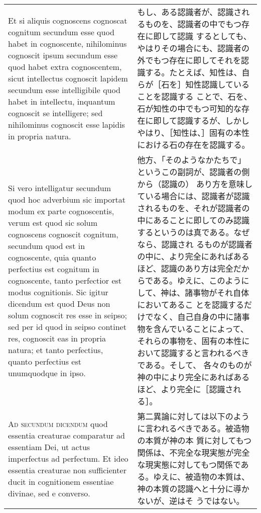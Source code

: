 \documentclass[10pt]{jsarticle} %
\begin{document}
\begin{longtable}{p{21em}p{21em}}
Et si aliquis cognoscens cognoscat cognitum secundum esse quod habet
in cognoscente, nihilominus cognoscit ipsum secundum esse quod habet
extra cognoscentem, sicut intellectus cognoscit lapidem secundum esse
intelligibile quod habet in intellectu, inquantum cognoscit se
intelligere; sed nihilominus cognoscit esse lapidis in propria natura.


&

もし、ある認識者が、認識されるものを、認識者の中でもつ存在に即して認識
するとしても、やはりその場合にも、認識者の外でもつ存在に即してそれを認
識する。たとえば、知性は、自らが［石を］知性認識していることを認識する
ことで、石を、石が知性の中でもつ可知的な存在に即して認識するが、しかし
やはり、［知性は、］固有の本性における石の存在を認識する。

\\



Si vero intelligatur secundum quod hoc adverbium sic importat modum ex
parte cognoscentis, verum est quod sic solum cognoscens cognoscit
cognitum, secundum quod est in cognoscente, quia quanto perfectius est
cognitum in cognoscente, tanto perfectior est modus cognitionis. Sic
igitur dicendum est quod Deus non solum cognoscit res esse in seipso;
sed per id quod in seipso continet res, cognoscit eas in propria
natura; et tanto perfectius, quanto perfectius est unumquodque in
ipso.

&

他方、「そのようなかたちで」というこの副詞が、認識者の側から（認識の）
あり方を意味している場合には、認識者が認識されるものを、それが認識者の
中にあることに即してのみ認識するというのは真である。なぜなら、認識され
るものが認識者の中に、より完全にあればあるほど、認識のあり方は完全だか
らである。ゆえに、このようにして、神は、諸事物がそれ自体においてあるこ
とを認識するだけでなく、自己自身の中に諸事物を含んでいることによって、
それらの事物を、固有の本性において認識すると言われるべきである。そして、
各々のものが神の中により完全にあればあるほど、より完全に［認識される］。

\\


{\scshape Ad secundum dicendum} quod essentia creaturae comparatur ad
essentiam Dei, ut actus imperfectus ad perfectum. Et ideo essentia
creaturae non sufficienter ducit in cognitionem essentiae divinae, sed
e converso.


&

第二異論に対しては以下のように言われるべきである。被造物の本質が神の本
質に対してもつ関係は、不完全な現実態が完全な現実態に対してもつ関係であ
る。ゆえに、被造物の本質は、神の本質の認識へと十分に導かないが、逆はそ
うではない。


\end{longtable}
\end{document}
